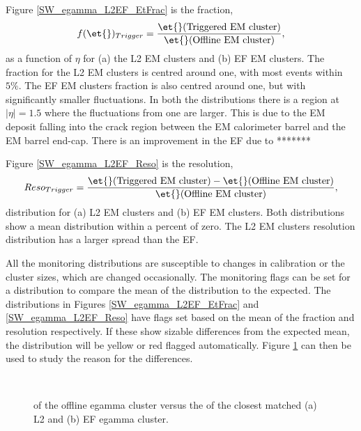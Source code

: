 Figure \ref{SW_egamma_L2EF_EtFrac} is the \et{} fraction,
\begin{equation}
f(\et{})_{Trigger}=\frac{\et{}(\rm{Triggered~EM~cluster})}{\et{}(\rm{Offline~EM~cluster})},
\label{SW:EtFrac}
\end{equation}
as a function of $\eta{}$ for (a) the L2 EM clusters and (b) EF EM clusters.
The \et{} fraction for the L2 EM clusters is centred around one, with most events within $5\%$.
The EF EM clusters \et{} fraction is also centred around one, but with significantly smaller fluctuations.
In both the distributions there is a region at $|\eta{}|=1.5$ where the fluctuations from one are larger.
This is due to the EM deposit falling into the crack region between the EM calorimeter barrel and the EM barrel end-cap.
There is an improvement in the EF due to *******

Figure \ref{SW_egamma_L2EF_Reso} is the \et{} resolution,
\begin{equation}
Reso_{Trigger}=\frac{\et{}(\rm{Triggered~EM~cluster})-\et{}(\rm{Offline~EM~cluster})}{\et{}(\rm{Offline~EM~cluster})},
\label{SW:EtReso}
\end{equation}
distribution for (a) L2 EM clusters and (b) EF EM clusters.
Both distributions show a mean \et{} distribution within a percent of zero. 
The L2 EM clusters \et{} resolution distribution has a larger spread than the EF.


All the monitoring distributions are susceptible to changes in calibration or the cluster sizes, which are changed occasionally. 
The monitoring flags can be set for a distribution to compare the mean of the distribution to the expected.
The distributions in Figures \ref{SW_egamma_L2EF_EtFrac} and \ref{SW_egamma_L2EF_Reso} have flags set based on the mean of the \et{} fraction and \et{} resolution respectively. 
If these show sizable differences from the expected mean, the distribution will be yellow or red flagged automatically.
Figure \ref{SW_egamma_L2EF_EtEt} can then be used to study the reason for the differences.

 
\begin{figure}
\centering
\mbox{
   \quad
      \quad
}
\caption[Offline egamma \et{} versus L2 and EF egamma \et{}]{\et{} of the offline egamma cluster versus the \et{} of the closest matched (a) L2 and (b) EF egamma cluster.\label{SW_egamma_L2EF_EtEt}}
\end{figure}

